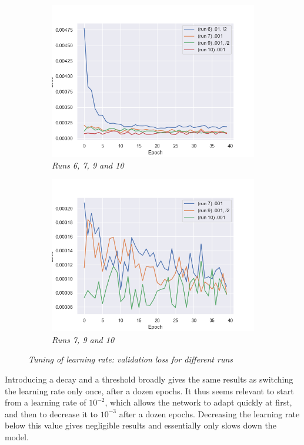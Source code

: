 \documentclass{article}
\begin{document}
\begin{figure}[!ht]
\begin{subfigure}{.39\linewidth}
            \end{subfigure}
            \begin{subfigure}{.49\linewidth}
                \centering
                \includegraphics[width=\linewidth]{pics/hpp-lr-loss-67910.png}
                \caption{\textit{Runs 6, 7, 9 and 10}}
            \end{subfigure}
            \begin{subfigure}{.49\linewidth}
                \centering
                \includegraphics[width=\linewidth]{pics/hpp-lr-loss-7910.png}
                \caption{\textit{Runs 7, 9 and 10}}
            \end{subfigure}
            \caption{\textit{Tuning of learning rate: validation loss for different runs}}
        \end{figure}
        \par
        Introducing a decay and a threshold broadly gives the same results as switching the learning rate only once, after a dozen epochs. It thus seems relevant to start from a learning rate of $10^{-2}$, which allows the network to adapt quickly at first, and then to decrease it to $10^{-3}$ after a dozen epochs. Decreasing the learning rate below this value gives negligible results and essentially only slows down the model.
        \newpage
\end{document}
